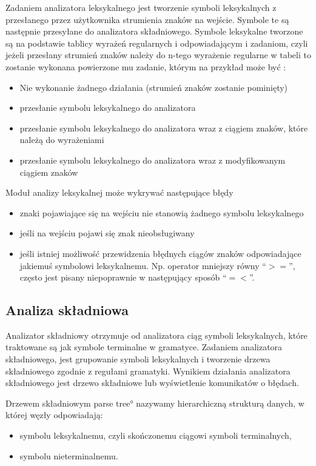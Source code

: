 Zadaniem analizatora leksykalnego jest tworzenie symboli leksykalnych 
z przesłanego przez użytkownika strumienia znaków na wejście. 
Symbole te są następnie przesyłane  do analizatora składniowego. 
Symbole leksykalne tworzone są na podstawie tablicy wyrażeń regularnych i odpowiadającym i zadaniom,
czyli jeżeli przesłany strumień znaków należy do  n-tego wyrażenie regularne w tabeli 
 to zostanie wykonana powierzone mu zadanie, 
 którym na przykład
 może być \cite{aho}:
\begin{itemize}
 \item Nie wykonanie żadnego działania (strumień znaków zostanie pominięty)
 \item przesłanie symbolu leksykalnego do analizatora
 \item przesłanie symbolu leksykalnego do analizatora wraz z ciągiem znaków, które należą do wyrażeniami
 \item przesłanie symbolu leksykalnego do analizatora wraz z modyfikowanym ciągiem znaków
\end{itemize}

Moduł analizy leksykalnej może wykrywać następujące błędy
      \begin{itemize}
	\item   znaki pojawiające się na wejściu nie stanowią żadnego symbolu leksykalnego
	\item   jeśli na wejściu pojawi się znak nieobsługiwany 
	\item   jeśli istniej możliwość przewidzenia błędnych ciągów znaków odpowiadające jakiemuś symbolowi leksykalnemu.
		Np. operator mniejszy równy \textquotedblleft$>=$\textquotedblright, 
		często jest pisany niepoprawnie w następujący sposób \textquotedblleft$=<$\textquotedblright.
		
		
      \end{itemize}

\subsection{Analiza składniowa} \label{p_skladniowa}


Analizator składniowy otrzymuje od analizatora ciąg symboli leksykalnych,
 które traktowane są jak symbole terminalne w gramatyce. Zadaniem analizatora składniowego,
 jest grupowanie symboli leksykalnych i tworzenie drzewa składniowego zgodnie
 z regułami gramatyki. 
Wynikiem działania analizatora składniowego jest drzewo składniowe lub wyświetlenie komunikatów o błędach.

Drzewem składniowym \ang{parse tree} nazywamy hierarchiczną strukturą danych,
 w której węzły odpowiadają:
\begin{itemize}
  \item  
    symbolu leksykalnemu, czyli skończonemu  ciągowi symboli terminalnych,
  \item  
    symbolu nieterminalnemu.
\end{itemize}


